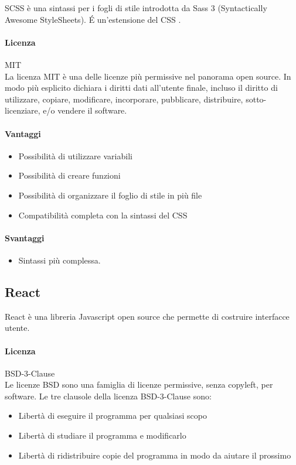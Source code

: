 SCSS è una sintassi per i fogli di stile introdotta da Sass 3 (Syntactically Awesome StyleSheets). \'E un'estensione del CSS .

\paragraph{Licenza} MIT \\
La licenza MIT è una delle licenze più permissive nel panorama open
source. In modo più esplicito dichiara i diritti dati all'utente
finale, incluso il diritto di utilizzare, copiare, modificare,
incorporare, pubblicare, distribuire, sotto-licenziare, e/o vendere il
software. 

\paragraph{Vantaggi}
\begin{itemize}
	\item Possibilità di utilizzare variabili
	\item Possibilità di creare funzioni 
	\item Possibilità di organizzare il foglio di stile in più file
	\item Compatibilità completa con la sintassi del CSS
\end{itemize}

\paragraph{Svantaggi} 
\begin{itemize}
	\item  Sintassi più complessa.
\end{itemize}

\subsection{React}

React è una libreria Javascript open source che permette di costruire interfacce utente. 
\\
\paragraph{Licenza} BSD-3-Clause \\
Le licenze BSD sono una famiglia di licenze permissive, senza copyleft, per software.
Le tre clausole della licenza BSD-3-Clause sono:
\\
\begin{itemize}
	\item Libertà di eseguire il programma per qualsiasi scopo
	\item Libertà di studiare il programma e modificarlo
	\item Libertà di ridistribuire copie del programma in modo da aiutare il prossimo
	
\end{itemize}

